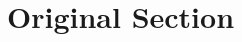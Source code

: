\documentclass{responseletter}
\begin{document}
\section{Original Section}\label{section}
\end{document}
